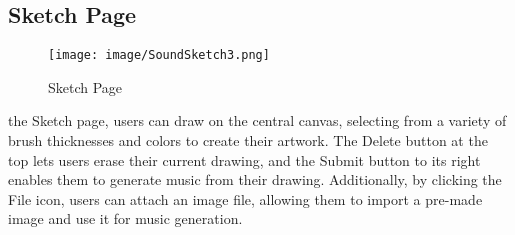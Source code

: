 \documentclass[conference]{IEEEtran}
\begin{document}
\subsection{Sketch Page}
\begin{figure}[h!]
    \centering
    \texttt{[image: image/SoundSketch3.png]}
    \caption{Sketch Page}
    \label{fig:enter-label}
\end{figure}

\noindentOn the Sketch page, users can draw on the central canvas, selecting from a variety of brush thicknesses and colors to create their artwork. The Delete button at the top lets users erase their current drawing, and the Submit button to its right enables them to generate music from their drawing. Additionally, by clicking the File icon, users can attach an image file, allowing them to import a pre-made image and use it for music generation.\\
\end{document}
